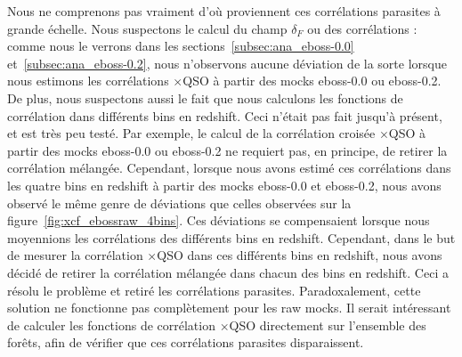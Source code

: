 Nous ne comprenons pas vraiment d'où proviennent ces corrélations parasites à grande échelle.
Nous suspectons le calcul du champ $\delta_F$ ou des corrélations : comme nous le verrons dans les sections~\ref{subsec:ana_eboss-0.0} et~\ref{subsec:ana_eboss-0.2}, nous n'observons aucune déviation de la sorte lorsque nous estimons les corrélations \lya{}$\times$QSO à partir des mocks eboss-0.0 ou eboss-0.2.
De plus, nous suspectons aussi le fait que nous calculons les fonctions de corrélation dans différents bins en redshift. Ceci n'était pas fait jusqu'à présent, et est très peu testé.
Par exemple, le calcul de la corrélation croisée \lya{}$\times$QSO à partir des mocks eboss-0.0 ou eboss-0.2 ne requiert pas, en principe, de retirer la corrélation mélangée. Cependant, lorsque nous avons estimé ces corrélations dans les quatre bins en redshift à partir des mocks eboss-0.0 et eboss-0.2, nous avons observé le même genre de déviations que celles observées sur la figure~\ref{fig:xcf_ebossraw_4bins}. Ces déviations se compensaient lorsque nous moyennions les corrélations des différents bins en redshift. Cependant, dans le but de mesurer la corrélation \lya{}$\times$QSO dans ces différents bins en redshift, nous avons décidé de retirer la corrélation mélangée dans chacun des bins en redshift. Ceci a résolu le problème et retiré les corrélations parasites.
Paradoxalement, cette solution ne fonctionne pas complètement pour les raw mocks. Il serait intéressant de calculer les fonctions de corrélation \lya{}$\times$QSO directement sur l'ensemble des forêts, afin de vérifier que ces corrélations parasites disparaissent.


